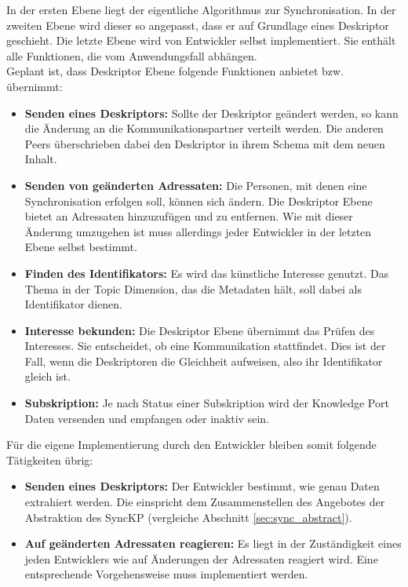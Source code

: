 \documentclass[a4paper]{article}
\begin{document}
	In der ersten Ebene liegt der eigentliche Algorithmus zur Synchronisation.
	In der zweiten Ebene wird dieser so angepasst, dass er auf Grundlage
	eines Deskriptor geschieht. Die letzte Ebene wird von Entwickler selbst
	implementiert. Sie enthält alle Funktionen, die vom Anwendungsfall abhängen. \\
	
	Geplant ist, dass Deskriptor Ebene folgende Funktionen anbietet bzw. übernimmt:
		\begin{itemize}
		\item \textbf{Senden eines Deskriptors:} Sollte der Deskriptor geändert
		werden, so kann die Änderung an die Kommunikationspartner
		verteilt werden. Die anderen Peers überschrieben dabei den Deskriptor
		in ihrem Schema mit dem neuen Inhalt.
		\item \textbf{Senden von geänderten Adressaten:} Die Personen, mit 
		denen eine Synchronisation erfolgen soll, können sich ändern. Die
		Deskriptor Ebene bietet an Adressaten hinzuzufügen und zu entfernen.
		Wie mit dieser Änderung umzugehen ist muss allerdings jeder Entwickler
		in der letzten Ebene selbst bestimmt.
		\item \textbf{Finden des Identifikators:} Es wird das künstliche Interesse
		genutzt. Das Thema in der Topic Dimension, das die Metadaten hält, soll
		dabei als Identifikator dienen.
		\item \textbf{Interesse bekunden:} Die Deskriptor Ebene übernimmt das
		Prüfen des Interesses. Sie entscheidet, ob eine Kommunikation stattfindet.
		Dies ist der Fall, wenn die Deskriptoren die Gleichheit aufweisen, also
		ihr Identifikator gleich ist.
		\item \textbf{Subskription:}  Je nach Status einer Subskription wird der
		Knowledge Port Daten versenden und empfangen oder inaktiv sein.		
	\end{itemize} 
	
	Für die eigene Implementierung durch den Entwickler bleiben somit folgende
	Tätigkeiten übrig:
	
	\begin{itemize}
		\item \textbf{Senden eines Deskriptors:} Der Entwickler bestimmt, wie
		genau Daten extrahiert werden. Die einspricht dem Zusammenstellen des
		Angebotes der Abstraktion des SyncKP (vergleiche Abschnitt
		\ref{sec:sync_abstract}).
		\item \textbf{Auf geänderten Adressaten reagieren:} Es liegt in der
		Zuständigkeit eines jeden Entwicklers wie auf Änderungen der Adressaten
		reagiert wird. Eine entsprechende Vorgehensweise muss implementiert 
		werden.
	\end{itemize} 
	
\end{document}
